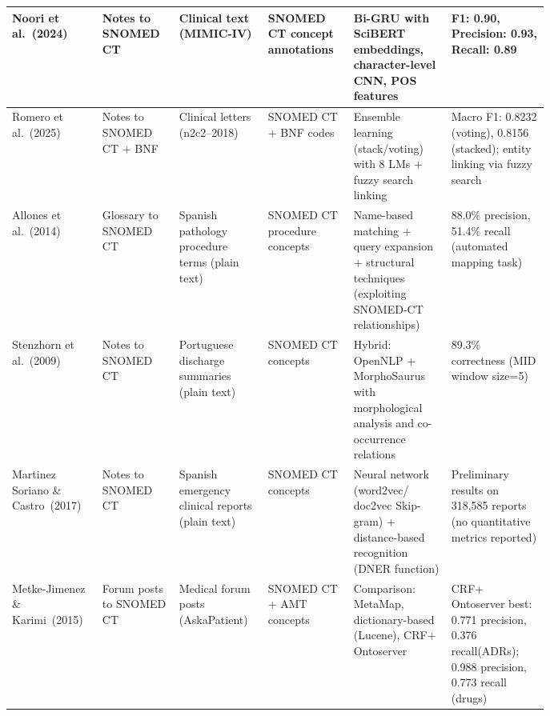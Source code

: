 \begin{longtable}{|L{0.11\linewidth}|L{0.11\linewidth}|L{0.12\linewidth}|L{0.12\linewidth}|L{0.16\linewidth}|L{0.16\linewidth}|}
Noori et al.~(2024) \cite{Noori:2024} & Notes to SNOMED CT & Clinical text (MIMIC-IV) & SNOMED CT concept annotations & Bi-GRU with SciBERT embeddings, character-level CNN, POS features & F1: 0.90, Precision: 0.93, Recall: 0.89 \\
\hline
Romero et al.~(2025) \cite{Romero:2025} & Notes to SNOMED CT + BNF & Clinical letters (n2c2--2018) & SNOMED CT + BNF codes & Ensemble learning (stack/voting) with 8 LMs + fuzzy search linking & Macro F1: 0.8232 (voting), 0.8156 (stacked); entity linking via fuzzy search \\
\hline
Allones et al.~(2014) \cite{Allones:2014} & Glossary to SNOMED CT & Spanish pathology procedure terms (plain text) & SNOMED CT procedure concepts & Name-based matching + query expansion + structural techniques (exploiting SNOMED-CT relationships) & 88.0\% precision, 51.4\% recall (automated mapping task) \\
\hline
Stenzhorn et al.~(2009) \cite{Stenzhorn:2009} & Notes to SNOMED CT & Portuguese discharge summaries (plain text) & SNOMED CT concepts & Hybrid: OpenNLP + MorphoSaurus with morphological analysis and co-occurrence relations & 89.3\% correctness (MID window size=5) \\
\hline
Martinez Soriano \& Castro~(2017) \cite{Martinez:2017} & Notes to SNOMED CT & Spanish emergency clinical reports (plain text) & SNOMED CT concepts & Neural network (word2vec/ doc2vec Skip-gram) + distance-based recognition (DNER function) & Preliminary results on 318,585 reports (no quantitative metrics reported) \\
\hline
Metke-Jimenez \& Karimi~(2015) \cite{MetkeJimenez:2015} & Forum posts to SNOMED CT & Medical forum posts (AskaPatient) & SNOMED CT + AMT concepts & Comparison: MetaMap, dictionary-based (Lucene), CRF+ Ontoserver & CRF+ Ontoserver best: 0.771 precision, 0.376 recall\newline (ADRs); 0.988 precision, 0.773 recall (drugs) \\
\hline

\end{longtable}
\normalsize
\normalsize
\setlength{\tabcolsep}{6pt}  %

